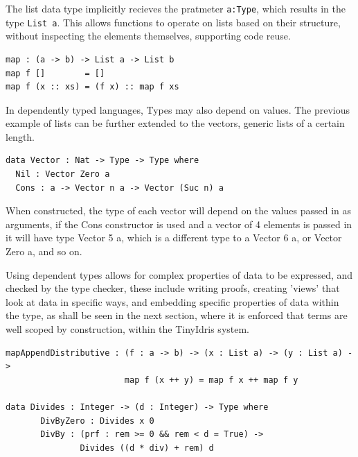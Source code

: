 \documentclass[a4paper]{article}
\begin{document}
The list data type implicitly recieves the pratmeter \texttt{a:Type}, which 
results in the type \texttt{List a}. This allows functions to operate on lists
based on their structure, without inspecting the elements themselves,
supporting code reuse. 

\begin{center}
\begin{verbatim}
map : (a -> b) -> List a -> List b
map f []        = []
map f (x :: xs) = (f x) :: map f xs
\end{verbatim}
\end{center}

In dependently typed languages, Types may also depend on values.
The previous example of lists can be further extended to the vectors,
generic lists of a certain length. 

\begin{center}
\begin{verbatim}
data Vector : Nat -> Type -> Type where
  Nil : Vector Zero a
  Cons : a -> Vector n a -> Vector (Suc n) a
\end{verbatim}
\end{center}

When constructed, the type of each vector will depend on the values 
passed in as arguments, if the Cons constructor is used and a vector of 
4 elements is passed in it will have type Vector 5 a, which is a 
different type to a Vector 6 a, or Vector Zero a, and so on. 

Using dependent types allows for complex properties of data to be 
expressed, and checked by the type checker, these include writing
proofs, creating 'views' that look at data in specific ways,
and embedding specific properties of data within the type, as shall be 
seen in the next section, where it is enforced that terms are well 
scoped by construction, within the TinyIdris system. 

\begin{center}
\begin{verbatim}
mapAppendDistributive : (f : a -> b) -> (x : List a) -> (y : List a) ->
						map f (x ++ y) = map f x ++ map f y

data Divides : Integer -> (d : Integer) -> Type where
	   DivByZero : Divides x 0
	   DivBy : (prf : rem >= 0 && rem < d = True) ->
			   Divides ((d * div) + rem) d
\end{verbatim}
\end{center}
\end{document}
